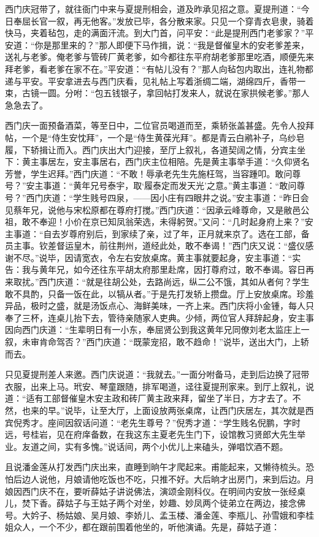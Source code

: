 西门庆冠带了，就往衙门中来与夏提刑相会，道及昨承见招之意。夏提刑道：“今日奉屈长官一叙，再无他客。”发放已毕，各分散来家。只见一个穿青衣皂隶，骑着快马，夹着毡包，走的满面汗流。到大门首，问平安：“此是提刑西门老爹家？”平安道：“你是那里来的？”那人即便下马作揖，说：“我是督催皇木的安老爹差来，送礼与老爹。俺老爹与管砖厂黄老爹，如今都往东平府胡老爹那里吃酒，顺便先来拜老爹，看老爹在家不在。”平安道：“有帖儿没有？”那人向毡包内取出，连礼物都递与平安。平安拿进去与西门庆看，见礼帖上写着浙绸二端，湖绵四斤，香带一束，古镜一圆。分咐：“包五钱银子，拿回帖打发来人，就说在家拱候老爹。”那人急急去了。

西门庆一面预备酒菜，等至日中，二位官员喝道而至，乘轿张盖甚盛。先令人投拜帖，一个是“侍生安忱拜”，一个是“侍生黄葆光拜”。都是青云白鹇补子，乌纱皂履，下轿揖让而入。西门庆出大门迎接，至厅上叙礼，各道契阔之情，分宾主坐下：黄主事居左，安主事居右，西门庆主位相陪。先是黄主事举手道：“久仰贤名芳誉，学生迟拜。”西门庆道：“不敢！辱承老先生先施枉驾，当容踵叩。敢问尊号？”安主事道：“黄年兄号泰宇，取‘履泰定而发天光’之意。”黄主事道：“敢问尊号？”西门庆道：“学生贱号四泉，——因小庄有四眼井之说。”安主事道：“昨日会见蔡年兄，说他与宋松原都在尊府打搅。”西门庆道：“因承云峰尊命，又是敝邑公祖，敢不奉迎！小价在京已知凤翁荣选，未得躬贺。”又问：“几时起身府上来？”安主事道：“自去岁尊府别后，到家续了亲，过了年，正月就来京了。选在工部，备员主事。钦差督运皇木，前往荆州，道经此处，敢不奉谒！”西门庆又说：“盛仪感谢不尽。”说毕，因请宽衣，令左右安放桌席。黄主事就要起身，安主事道：“实告：我与黄年兄，如今还往东平胡太府那里赴席，因打尊府过，敢不奉谒。容日再来取扰。”西门庆道：“就是往胡公处，去路尚远，纵二公不饿，其如从者何？学生敢不具酌，只备一饭在此，以犒从者。”于是先打发轿上攒盘。厅上安放桌席。珍羞异品，极时之盛，就是汤饭点心、海鲜美味，一齐上来。西门庆将小金锺，每人只奉了三杯，连桌儿抬下去，管待亲随家人吏典。少倾，两位官人拜辞起身，安主事因向西门庆道：“生辈明日有一小东，奉屈贤公到我这黄年兄同僚刘老太监庄上一叙，未审肯命驾否？”西门庆道：“既蒙宠招，敢不趋命！”说毕，送出大门，上轿而去。

只见夏提刑差人来邀。西门庆说道：“我就去。”一面分咐备马，走到后边换了冠带衣服，出来上马。玳安、琴童跟随，排军喝道，迳往夏提刑家来。到厅上叙礼，说道：“适有工部督催皇木安主政和砖厂黄主政来拜，留坐了半日，方才去了。不然，也来的早。”说毕，让至大厅，上面设放两张桌席，让西门庆居左，其次就是西宾倪秀才。座间因叙话问道：“老先生尊号？”倪秀才道：“学生贱名倪鹏，字时远，号桂岩，见在府庠备数，在我这东主夏老先生门下，设馆教习贤郎大先生举业。友道之间，实有多愧。”说话间，两个小优儿上来磕头，弹唱饮酒不题。

且说潘金莲从打发西门庆出来，直睡到晌午才爬起来。甫能起来，又懒待梳头。恐怕后边人说他，月娘请他吃饭也不吃，只推不好。大后晌才出房门，来到后边。月娘因西门庆不在，要听薛姑子讲说佛法，演颂金刚科仪。在明间内安放一张经桌儿，焚下香。薛姑子与王姑子两个对坐，妙趣、妙凤两个徒弟立在两边，接念佛号。大妗子、杨姑娘、吴月娘、李娇儿、孟玉楼、潘金莲、李瓶儿、孙雪娥和李桂姐众人，一个不少，都在跟前围着他坐的，听他演诵。先是，薛姑子道：

